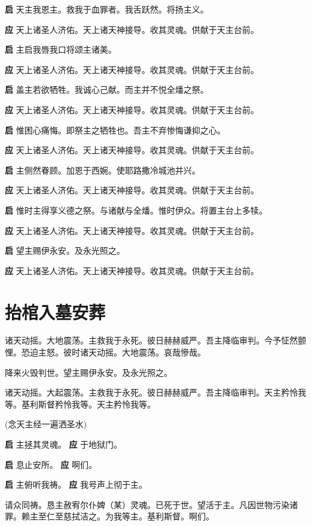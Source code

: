 \documentclass[UTF8,17pt]{ctexart}
\begin{document}
\textbf{启} \quad 天主我恩主。救我于⾎罪者。我⾆跃然。将扬主义。

\textbf{应} \quad 天上诸圣⼈济佑。天上诸天神接导。收其灵魂。供献于天主台前。

\textbf{启} \quad 主启我唇我口将颂主诸美。

\textbf{应} \quad 天上诸圣⼈济佑。天上诸天神接导。收其灵魂。供献于天主台前。

\textbf{启} \quad 盖主若欲牺牲。我诚⼼⼰献。⽽主并不悦全燔之祭。

\textbf{应} \quad 天上诸圣⼈济佑。天上诸天神接导。收其灵魂。供献于天主台前。

\textbf{启} \quad 惟困⼼痛悔。即祭主之牺牲也。吾主不弃惨悔谦抑之⼼。

\textbf{应} \quad 天上诸圣⼈济佑。天上诸天神接导。收其灵魂。供献于天主台前。

\textbf{启} \quad 主侧然眷顾。加恩于西婉。使耶路撒冷城池并兴。

\textbf{应} \quad 天上诸圣⼈济佑。天上诸天神接导。收其灵魂。供献于天主台前。

\textbf{启} \quad 惟时主得享义德之祭。与诸献与全燔。惟时伊众。将置主台上多犊。

\textbf{应} \quad 天上诸圣⼈济佑。天上诸天神接导。收其灵魂。供献于天主台前。

\textbf{启} \quad 望主赐伊永安。及永光照之。

\textbf{应} \quad 天上诸圣⼈济佑。天上诸天神接导。收其灵魂。供献于天主台前。

\section{抬棺⼊墓安葬}
\label{tai-guan-ru-mu-an-zang}

诸天动摇。⼤地震荡。主救我于永死。彼⽇赫赫威严。吾主降临审判。今予怔然颤悝。恐迫主怒。彼时诸天动摇。⼤地震荡。哀哉慘哉。

降来⽕毁判世。望主赐伊永安。及永光照之。

诸天动摇。⼤起震荡。主救我于永死。彼⽇赫赫威严。吾主降临审判。天主矜怜我等。基利斯督矜怜我等。天主矜怜我等。

(念天主经⼀遍洒圣⽔)

\textbf{启} \quad 主拯其灵魂。 \hfill \textbf{应} \quad 于地狱门。

\textbf{启} \quad 息⽌安所。 \hfill \textbf{应} \quad 啊们。

\textbf{启} \quad 主俯听我祷。 \hfill \textbf{应} \quad 我号声上彻于主。

请众同祷。恳主赦宥尔仆婢（某）灵魂。已死于世。望活于主。凡因世物污染诸罪。赖主⾄仁⾄慈拭洁之。为我等主。基利斯督。啊们。
\end{document}
